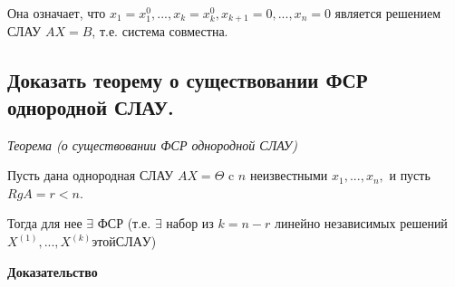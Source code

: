 Она означает, что $x_1 = x^0_1, ..., x_k = x^0_k, x_{k+1} = 0, ..., x_n = 0$ является решением СЛАУ $AX = B$, т.е. система совместна.

\ep

\subsection{Доказать теорему о существовании ФСР однородной СЛАУ.}

\textit{Теорема (о существовании ФСР однородной СЛАУ)}

\vspace*{15pt}

Пусть дана однородная СЛАУ $AX = \Theta$ c $n$ неизвестными $x_1, ..., x_n,$ и пусть $RgA = r < n$.

Тогда для нее $\exists$ ФСР (т.е. $\exists$ набор из $k = n - r$ линейно независимых решений $X^{(1)}, ..., X^{(k)} этой СЛАУ$)

\vspace*{15pt}

{\bf{Доказательство}}

